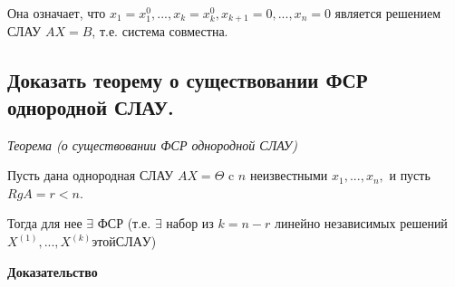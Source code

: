 Она означает, что $x_1 = x^0_1, ..., x_k = x^0_k, x_{k+1} = 0, ..., x_n = 0$ является решением СЛАУ $AX = B$, т.е. система совместна.

\ep

\subsection{Доказать теорему о существовании ФСР однородной СЛАУ.}

\textit{Теорема (о существовании ФСР однородной СЛАУ)}

\vspace*{15pt}

Пусть дана однородная СЛАУ $AX = \Theta$ c $n$ неизвестными $x_1, ..., x_n,$ и пусть $RgA = r < n$.

Тогда для нее $\exists$ ФСР (т.е. $\exists$ набор из $k = n - r$ линейно независимых решений $X^{(1)}, ..., X^{(k)} этой СЛАУ$)

\vspace*{15pt}

{\bf{Доказательство}}

